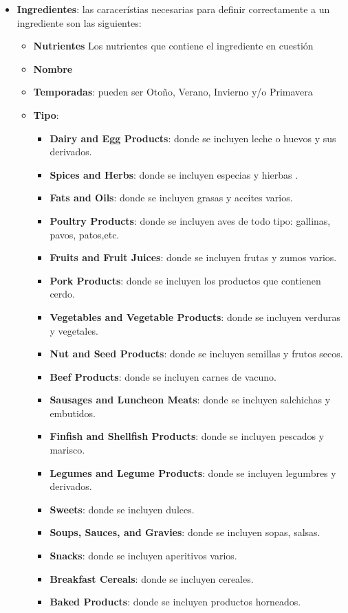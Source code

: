 \documentclass[12]{article}
\begin{document}
\begin{itemize}
	\item \textbf{Ingredientes}: las caracerístias necesarias para definir correctamente a un ingrediente son las siguientes: \begin{itemize}
		\item \textbf{Nutrientes} Los nutrientes que contiene el ingrediente en cuestión
		\item \textbf{Nombre}
		\item \textbf{Temporadas}: pueden ser Otoño, Verano, Invierno y/o Primavera
		\item \textbf{Tipo}: \begin{itemize}
			\item \textbf{Dairy and Egg Products}: donde se incluyen leche o huevos y sus derivados.
			\item \textbf{Spices and Herbs}: donde se incluyen especias y hierbas .
			\item \textbf{Fats and Oils}: donde se incluyen grasas y aceites varios.
			\item \textbf{Poultry Products}: donde se incluyen aves de todo tipo: gallinas, pavos, patos,etc.
			\item \textbf{Fruits and Fruit Juices}: donde se incluyen frutas y zumos varios. 
			\item \textbf{Pork Products}: donde se incluyen los productos que contienen cerdo.
			\item \textbf{Vegetables and Vegetable Products}: donde se incluyen verduras y vegetales.
			\item \textbf{Nut and Seed Products}: donde se incluyen semillas y frutos secos.
			\item \textbf{Beef Products}: donde se incluyen carnes de vacuno.
			\item \textbf{Sausages and Luncheon Meats}: donde se incluyen salchichas y embutidos.
			\item \textbf{Finfish and Shellfish Products}: donde se incluyen pescados y marisco.
			\item \textbf{Legumes and Legume Products}: donde se incluyen legumbres y derivados.
			\item \textbf{Sweets}: donde se incluyen dulces.
			\item \textbf{Soups, Sauces, and Gravies}: donde se incluyen sopas, salsas.
			\item \textbf{Snacks}: donde se incluyen aperitivos varios.
			\item \textbf{Breakfast Cereals}: donde se incluyen cereales.
			\item \textbf{Baked Products}: donde se incluyen productos horneados.

\end{itemize}
\end{itemize}
\end{itemize}
\end{document}
